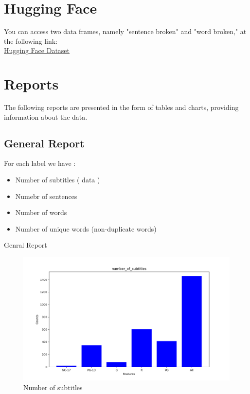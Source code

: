 \documentclass[a4paper]{article}
\begin{document}
\section{Hugging Face}

You can access two data frames, namely "sentence broken" and "word broken," at the following link: \\
\href{https://huggingface.co/datasets/Baktashans/Subttitles_AgeRate_Data}{Hugging Face Dataset}



\section{Reports}

The following reports are presented in the form of tables and charts, providing information about the data.

\subsection*{General Report}

For each label we have :

\begin{itemize}

    \item Number of subtitles ( data )
    \item Numebr of sentences
    \item Number of words
    \item Number of unique words (non-duplicate words)

\end{itemize}



\begin{table}[ht]
    \centering
    \caption{Genral Report}
    \label{tab:data}
\end{table}

\begin{figure}[ht]
    \centering
    \includegraphics[width=1\textwidth]{../stats/number_of_subtitles.png}
    \caption{Number of subtitles}
\end{figure}
\end{document}
